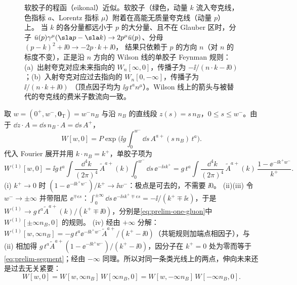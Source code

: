 \begin{figure}[htbp]
\caption{软胶子的程函（eikonal）近似。软胶子（绿色，动量 $k$ 流入夸克线，色指标 $a$、Lorentz 指标 $\mu$）附着在高能无质量夸克线（动量 $p$）上。
当 $k$ 的各分量都远小于 $p$ 的大分量、且不在 Glauber 区时，分子 $\bar u(p)\gamma^\mu(\sla p-\sla k)\to2p^\mu\bar u(p)$、分母 $(p-k)^2+\ii0\to-2p\cdot k+\ii0$，
结果只依赖于 $p$ 的方向 $n$（对 $n$ 的标度不变），正是沿 $n$ 方向的 Wilson 线的单胶子 Feynman 规则：
(a)~出射夸克对应未来指向的 $W_n[\infty,0]$，传播子为 $-\ii/(n\cdot k-\ii0)$；(b)~入射夸克对应过去指向的 $W_n[0,-\infty]$，传播子为 $\ii/(n\cdot k+\ii0)$
（顶点因子均为 $\ii g\,t^a n^\mu$）。Wilson 线上的箭头与被替代的夸克线的费米子数流向一致。}
\label{fig:soft-eikonal}
\end{figure}

\begin{example}[有限类光线段的单胶子项]\label{ex:prelim-wilson-segment}
取 $w=(0^+,w^-,\mathbf 0_{\mathrm T})=w^-n_B$ 与沿 $n_B$ 的直线段 $z(s)=s\,n_B$，$0\le s\le w^-$。由于 $\dd z\cdot A=\dd s\,n_B\cdot A=\dd s\,A^+$，
\[
W[w,0]=P\exp\Big(\ii g\int_0^{w^-}\dd s\,A^{a+}(s\,n_B)\,t^a\Big).
\]
代入 Fourier 展开并用 $k\cdot n_B=k^+$，单胶子项为
\begin{equation}\label{eq:prelim-segment}
W^{(1)}[w,0]=\ii g\,t^a\!\int\!\frac{\dd^4k}{(2\pi)^4}\,\tilde A^{a+}(k)\int_0^{w^-}\!\dd s\,\ee^{-\ii sk^+}=g\,t^a\!\int\!\frac{\dd^4k}{(2\pi)^4}\,\tilde A^{a+}(k)\,\frac{1-\ee^{-\ii k^+w^-}}{k^+}.
\end{equation}
(i) $k^+\to0$ 时 $(1-\ee^{-\ii k^+w^-})/k^+\to\ii w^-$：极点是可去的，不需要 $\ii0$。
(ii)(iii) 令 $w^-\to\pm\infty$ 并带阻尼 $\ee^{\mp\epsilon s}$：$\int_0^{\pm\infty}\dd s\,\ee^{-\ii sk^+\mp\epsilon s}=-\ii/(k^+\mp\ii\epsilon)$，于是 $W^{(1)}\to g\,t^a\tilde A^{a+}(k)/(k^+\mp\ii0)$，分别是\cref{eq:prelim-one-gluon}中 $W^{(1)}[\pm\infty n_B,0]$ 的规则。
(iv) 经由 $+\infty$ 分解：$W^{(1)}[w,\infty n_B]=-g\,t^a\ee^{-\ii k^+w^-}\tilde A^{a+}/(k^+-\ii0)$（共轭规则加端点相因子），与 (ii) 相加得 $g\,t^a\tilde A^{a+}(1-\ee^{-\ii k^+w^-})/(k^+-\ii0)$，因分子在 $k^+=0$ 处为零而等于\cref{eq:prelim-segment}；经由 $-\infty$ 同理。所以对同一条类光线上的两点，伸向未来还是过去无关紧要：
\[
W[w,0]=W[w,\infty n_B]\,W[\infty n_B,0]=W[w,-\infty n_B]\,W[-\infty n_B,0].
\]
\end{example}

